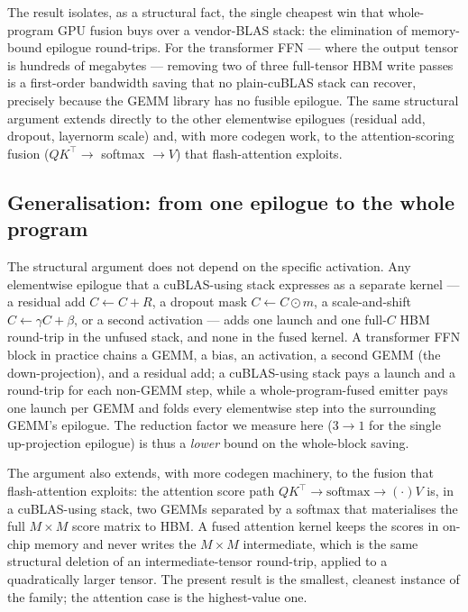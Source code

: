 \documentclass[11pt,a4paper]{article}
\begin{document}
The result isolates, as a structural fact, the single cheapest win that
whole-program GPU fusion buys over a vendor-BLAS stack: the elimination of
memory-bound epilogue round-trips. For the transformer FFN --- where the output
tensor is hundreds of megabytes --- removing two of three full-tensor HBM write
passes is a first-order bandwidth saving that no plain-cuBLAS stack can recover,
precisely because the GEMM library has no fusible epilogue. The same structural
argument extends directly to the other elementwise epilogues (residual add,
dropout, layernorm scale) and, with more codegen work, to the
attention-scoring fusion ($QK^{\top}\to$ softmax $\to V$) that flash-attention
exploits.

\subsection{Generalisation: from one epilogue to the whole program}

The structural argument does not depend on the specific activation. Any
elementwise epilogue that a cuBLAS-using stack expresses as a separate kernel
--- a residual add $C \leftarrow C + R$, a dropout mask $C \leftarrow C \odot
m$, a scale-and-shift $C \leftarrow \gamma C + \beta$, or a second activation
--- adds one launch and one full-$C$ HBM round-trip in the unfused stack, and
none in the fused kernel. A transformer FFN block in practice chains a GEMM, a
bias, an activation, a second GEMM (the down-projection), and a residual add;
a cuBLAS-using stack pays a launch and a round-trip for each non-GEMM step,
while a whole-program-fused emitter pays one launch per GEMM and folds every
elementwise step into the surrounding GEMM's epilogue. The reduction factor we
measure here ($3\to1$ for the single up-projection epilogue) is thus a
\emph{lower} bound on the whole-block saving.

The argument also extends, with more codegen machinery, to the
fusion that flash-attention exploits: the attention score path $QK^{\top}\to
\mathrm{softmax}\to (\cdot)V$ is, in a cuBLAS-using stack, two GEMMs separated
by a softmax that materialises the full $M\times M$ score matrix to HBM. A
fused attention kernel keeps the scores in on-chip memory and never writes the
$M\times M$ intermediate, which is the same structural deletion of an
intermediate-tensor round-trip, applied to a quadratically larger tensor. The
present result is the smallest, cleanest instance of the family; the
attention case is the highest-value one.
\end{document}
